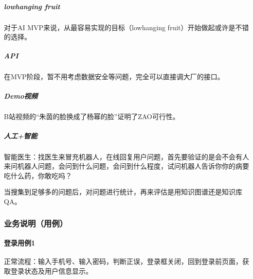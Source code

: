 \documentclass[letterpaper,11pt,english]{sphinxmanual}
\begin{document}
\subparagraph{low\sphinxhyphen{}hanging fruit}
\label{\detokenize{chapter_knowledge/MVP:low-hanging-fruit}}
对于AI MVP来说，从最容易实现的目标（low\sphinxhyphen{}hanging
fruit）开始做起或许是不错的选择。%
\begin{footnote}[552]\sphinxAtStartFootnote
{}
%
\end{footnote}


\subparagraph{API}
\label{\detokenize{chapter_knowledge/MVP:api}}
在MVP阶段，暂不用考虑数据安全等问题，完全可以直接调大厂的接口。


\subparagraph{Demo视频}
\label{\detokenize{chapter_knowledge/MVP:demo}}
B站视频的“朱茵的脸换成了杨幂的脸”证明了ZAO可行性。


\subparagraph{人工+智能}
\label{\detokenize{chapter_knowledge/MVP:id8}}
智能医生：找医生来冒充机器人，在线回复用户问题，首先要验证的是会不会有人来问机器人问题，会问到什么问题，会问到什么程度，试问机器人告诉你你的病要吃什么药，你敢吃吗？

当搜集到足够多的问题后，对问题进行统计，再来评估是用知识图谱还是知识库QA。


\subsubsection{业务说明（用例）}
\label{\detokenize{chapter_knowledge/service_analysis:id1}}\label{\detokenize{chapter_knowledge/service_analysis::doc}}

\paragraph{登录用例1\sphinxfootnotemark[553]}
\label{\detokenize{chapter_knowledge/service_analysis:id2}}%
\begin{footnotetext}[553]\sphinxAtStartFootnote
{}
%
\end{footnotetext}\ignorespaces 
正常流程：输入手机号、输入密码，判断正误，登录框关闭，回到登录前页面，获取登录状态及用户信息显示。
\end{document}
